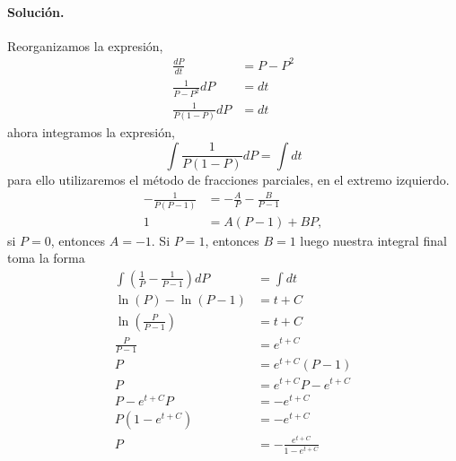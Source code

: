 \documentclass{article}
\begin{document}
\paragraph{Solución.} Reorganizamos la expresión,
\begin{align*}
	\frac{dP}{dt} &= P - P^{2}\\
	\frac{1}{P - P^{2}} dP &= dt\\
	\frac{1}{P(1 - P)} dP &= dt
\end{align*}
ahora integramos la expresión,
$$\int \frac{1}{P(1 - P)} dP = \int dt$$
para ello utilizaremos el método de fracciones parciales, en el extremo izquierdo.
\begin{align*}
-\frac{1}{P(P-1)} &= -\frac{A}{P} - \frac{B}{P-1}\\
1 &= A(P-1) + BP,
\end{align*}
si $P=0$, entonces $A=-1$. Si $P=1$, entonces $B = 1$ luego nuestra integral final toma la forma
\begin{align*}
\int \left( \frac{1}{P} - \frac{1}{P-1}\right) dP &= \int dt\\
	\ln{(P)} - \ln{(P-1)} &= t + C\\
	\ln{\left(\frac{P}{P-1}\right)} &= t + C\\
	\frac{P}{P-1} &= e^{t+C}\\
	P &= e^{t+C}(P-1)\\
	P &= e^{t+C}P - e^{t+C}\\
	P - e^{t+C}P &= - e^{t+C}\\
	P(1 - e^{t+C}) &= - e^{t+C}\\
	P &= - \frac{e^{t+C}}{1 - e^{t+C}}
\end{align*}
\end{document}
